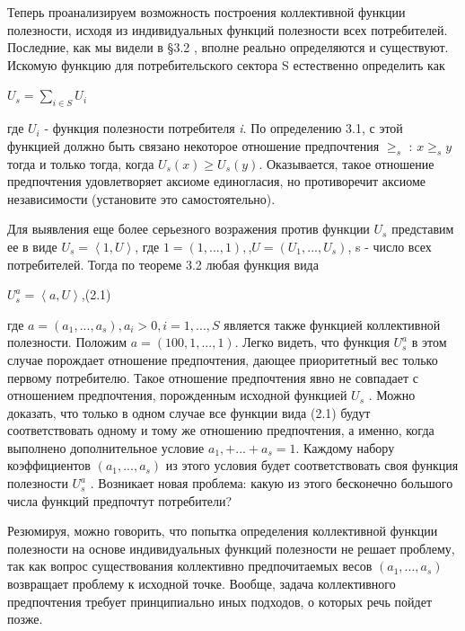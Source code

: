 \documentclass[12pt, 4paper]{book}
\begin{document}
{Теперь проанализируем возможность построения коллективной функции полезности, исходя из индивидуальных функций полезности всех потребителей. Последние, как мы видели в §3.2 , вполне реально определяются и существуют. Искомую функцию для потребительского сектора S естественно определить как
\begin{center}
$U_s = \sum\limits_{i\in S}U_i$
\end{center}
\par

где $U_i$ - функция полезности потребителя \textit{i}. По определению 3.1, с этой функцией должно быть связано некоторое отношение предпочтения $\geq_s$ : $x \geq_s y$ тогда и только тогда, когда $U_s(x) \geq U_s(y)$. Оказывается, такое отношение предпочтения удовлетворяет аксиоме единогласия, но противоречит аксиоме независимости (установите это самостоятельно).
\par

Для выявления еще более серьезного возражения против функции $U_s$ представим ее в виде $U_s = \left\langle 1,U \right\rangle$, где $1=(1,...,1),$,$U=(U_1,...,U_s)$, s - число всех потребителей. Тогда по теореме 3.2 любая функция вида
\begin{center}
$U_{s}^{a} = \left\langle  a,U \right\rangle$,(2.1)
\end{center}
где $a=(a_1,...,a_s),a_i > 0, i=1,...,S$ является также функцией коллективной полезности. Положим $a = (100,1,...,1)$. Легко видеть, что функция $U_{s}^{a}$ в этом случае порождает отношение предпочтения, дающее приоритетный вес только первому потребителю. Такое отношение предпочтения явно не совпадает с отношением предпочтения, порожденным исходной функцией $U_s$ . Можно доказать, что только в одном случае все функции вида (2.1) будут соответствовать одному и тому же отношению предпочтения, а именно, когда выполнено дополнительное условие $a_1,+...+a_s=1$. Каждому набору коэффициентов $(a_1,...,a_s)$ из этого условия будет соответствовать своя функция полезности $U_{s}^{a}$ . Возникает новая проблема: какую из этого бесконечно большого числа функций предпочтут потребители?
\par

Резюмируя, можно говорить, что попытка определения коллективной функции полезности на основе индивидуальных функций полезности не решает проблему, так как вопрос существования коллективно предпочитаемых весов $(a_1,...,a_s)$ возвращает проблему к исходной точке. Вообще, задача коллективного предпочтения требует принципиально иных подходов, о которых речь пойдет позже.
\par

}
\end{document}
